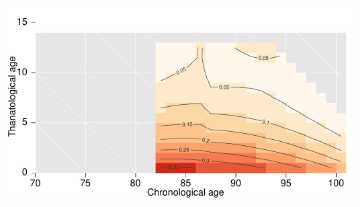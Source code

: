 \documentclass[12pt,oneside,a4paper,doublespacing]{article} %
\theoremstyle{definition}
\begin{document}
\begin{figure}[h!] 
\centering
\caption{~}
\vspace{-1em}
\begin{subfigure}{.46\textwidth}
\centering
\includegraphics[scale=0.32]{srhpoor1905.pdf}
\end{subfigure}
~
\begin{subfigure}{.46\textwidth}
\centering
\end{subfigure}


\end{figure}
\end{document}
